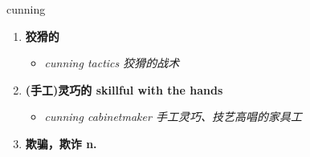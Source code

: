 
\begin{frame}
{\huge cunning}
\begin{center}
\begin{enumerate}\Large
  \item \textbf{狡猾的}
  \begin{itemize}
    \item \em{\Large{cunning tactics 狡猾的战术}}
  \end{itemize}
  \item \textbf{(手工)灵巧的 skillful with the hands}
  \begin{itemize}
    \item \em{\Large{cunning cabinetmaker 手工灵巧、技艺高唱的家具工}}
  \end{itemize}
  \item \textbf{欺骗，欺诈 n.}
\end{enumerate}
\end{center}
\end{frame}
